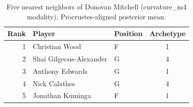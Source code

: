 \begin{table}[htbp]
  \centering\small
  \begin{tabular}{rllc}
    \toprule
    Rank & Player & Position & Archetype \\
    \midrule
    1 & Christian Wood & F & 1 \\
    2 & Shai Gilgeous-Alexander & G & 4 \\
    3 & Anthony Edwards & G & 1 \\
    4 & Nick Calathes & G & 4 \\
    5 & Jonathan Kuminga & F & 1 \\
    \bottomrule
  \end{tabular}
  \caption{Five nearest neighbors of Donovan Mitchell (curvature_m4 modality), Procrustes-aligned posterior mean.}
  \label{tab:Donovan_Mitchell_neighbors_curvature_m4}
\end{table}

